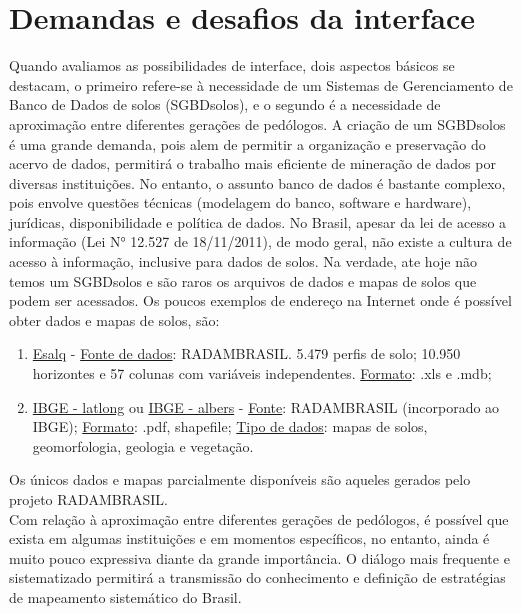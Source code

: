 \section{Demandas e desafios da interface}
Quando  avaliamos  as  possibilidades  de  interface,  dois  aspectos básicos se destacam, o primeiro refere-se à necessidade de um Sistemas de Gerenciamento de Banco de Dados de solos (SGBDsolos), e o segundo é a necessidade de aproximação entre diferentes gerações de pedólogos. A criação de um SGBDsolos é uma grande demanda, pois alem de permitir a organização e preservação do acervo de dados, permitirá o trabalho mais eficiente de mineração de dados por diversas instituições. No entanto, o assunto banco de dados é bastante complexo, pois envolve questões técnicas (modelagem do banco, software e hardware), jurídicas, disponibilidade e política de dados. No Brasil, apesar da lei de acesso a informação (Lei N° 12.527 de 18/11/2011), de modo geral, não existe a cultura de acesso à informação, inclusive para dados de solos. Na verdade, ate hoje não temos um SGBDsolos e são raros os arquivos de dados e mapas de solos que podem ser acessados. Os poucos exemplos de endereço na Internet onde é possível obter dados 
e mapas de solos, são:
\begin{enumerate}
\item \href{http://www.esalq.usp.br/gerd}{Esalq} - \underline{Fonte de dados}: RADAMBRASIL. 5.479 perfis de solo; 10.950 horizontes e 57 colunas com variáveis independentes. \underline{Formato}: .xls e .mdb;
\item \href{ftp://geoftp.ibge.gov.br/mapeamento_sistematico/banco_dados_georeferenciado_recursos_naturais/latlong/}{IBGE - latlong} ou \href{ftp://geoftp.ibge.gov.br/mapeamento_sistematico/banco_dados_georeferenciado_recursos_naturais/albers/}{IBGE - albers} - \underline{Fonte}: RADAMBRASIL (incorporado ao IBGE); \underline{Formato}: .pdf, shapefile; \underline{Tipo de dados}: mapas de solos, geomorfologia, geologia e vegetação.
\end{enumerate}
Os únicos dados e mapas parcialmente disponíveis são aqueles gerados pelo projeto RADAMBRASIL.\\
Com relação à aproximação entre diferentes gerações de pedólogos, é possível que exista em algumas instituições e em momentos específicos, no entanto, ainda é muito pouco expressiva diante da grande importância. O diálogo mais frequente e sistematizado permitirá a transmissão do conhecimento e definição de estratégias de mapeamento sistemático do Brasil.\\
